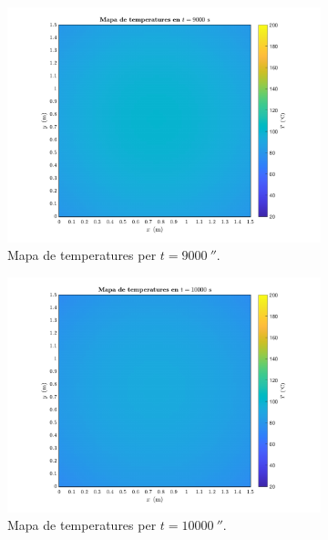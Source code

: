 \begin{figure}[ht]
\begin{subfigure}{.5\textwidth}
		\centering
		\includegraphics[width=.95\linewidth]{imagenes/06_canvi_condicions_contorn/t_9000.pdf}
		\vspace{-10pt}
		\caption{Mapa de temperatures per $t = 9000 \ \second$.}
		\label{fig:nou_t_9000}
	\end{subfigure}%
	\begin{subfigure}{.5\textwidth}
		\centering
		\includegraphics[width=.95\linewidth]{imagenes/06_canvi_condicions_contorn/t_10000.pdf}
		\vspace{-10pt}
		\caption{Mapa de temperatures per $t = 10000 \ \second$.}
		\label{fig:nou_t_10000}
	\end{subfigure}
	\begin{subfigure}{.5\textwidth}
		\centering

\end{subfigure}
\end{figure}
